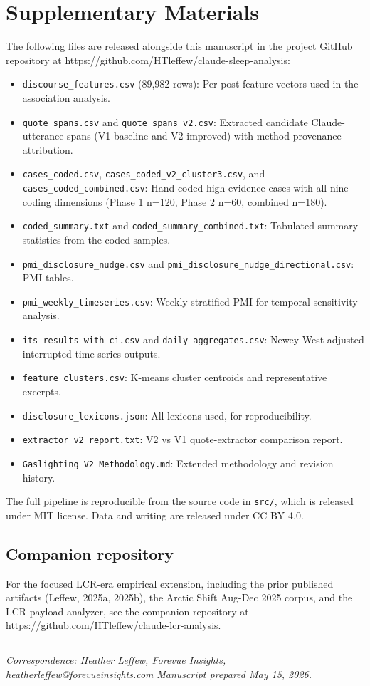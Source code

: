\documentclass{obelus-preprint}
\begin{document}
\section{Supplementary Materials}
The following files are released alongside this manuscript in the project GitHub repository at https://github.com/HTleffew/claude-sleep-analysis:
\begin{itemize}[leftmargin=*]
  \item \texttt{discourse\_features.csv} (89,982 rows): Per-post feature vectors used in the association analysis.
  \item \texttt{quote\_spans.csv} and \texttt{quote\_spans\_v2.csv}: Extracted candidate Claude-utterance spans (V1 baseline and V2 improved) with method-provenance attribution.
  \item \texttt{cases\_coded.csv}, \texttt{cases\_coded\_v2\_cluster3.csv}, and \texttt{cases\_coded\_combined.csv}: Hand-coded high-evidence cases with all nine coding dimensions (Phase 1 n=120, Phase 2 n=60, combined n=180).
  \item \texttt{coded\_summary.txt} and \texttt{coded\_summary\_combined.txt}: Tabulated summary statistics from the coded samples.
  \item \texttt{pmi\_disclosure\_nudge.csv} and \texttt{pmi\_disclosure\_nudge\_directional.csv}: PMI tables.
  \item \texttt{pmi\_weekly\_timeseries.csv}: Weekly-stratified PMI for temporal sensitivity analysis.
  \item \texttt{its\_results\_with\_ci.csv} and \texttt{daily\_aggregates.csv}: Newey-West-adjusted interrupted time series outputs.
  \item \texttt{feature\_clusters.csv}: K-means cluster centroids and representative excerpts.
  \item \texttt{disclosure\_lexicons.json}: All lexicons used, for reproducibility.
  \item \texttt{extractor\_v2\_report.txt}: V2 vs V1 quote-extractor comparison report.
  \item \texttt{Gaslighting\_V2\_Methodology.md}: Extended methodology and revision history.
\end{itemize}
The full pipeline is reproducible from the source code in \texttt{src/}, which is released under MIT license. Data and writing are released under CC BY 4.0.
\subsection{Companion repository}
For the focused LCR-era empirical extension, including the prior published artifacts (Leffew, 2025a, 2025b), the Arctic Shift Aug-Dec 2025 corpus, and the LCR payload analyzer, see the companion repository at https://github.com/HTleffew/claude-lcr-analysis.
\bigskip\hrule\bigskip
\emph{Correspondence: Heather Leffew, Forevue Insights, heatherleffew@forevueinsights.com} \emph{Manuscript prepared May 15, 2026.}
\end{document}
